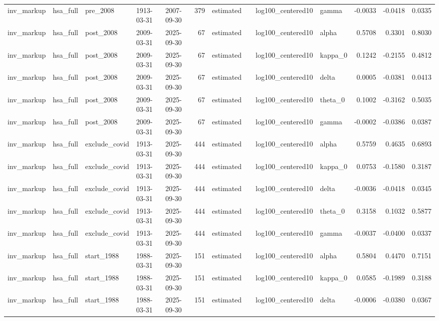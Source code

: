 \begin{tabular}{lllllrllllrrr}
inv\_markup & hsa\_full & pre\_2008 & 1913-03-31 & 2007-09-30 & 379 & estimated &  & log100\_centered10 & gamma & -0.0033 & -0.0418 & 0.0335 \\
inv\_markup & hsa\_full & post\_2008 & 2009-03-31 & 2025-09-30 & 67 & estimated &  & log100\_centered10 & alpha & 0.5708 & 0.3301 & 0.8030 \\
inv\_markup & hsa\_full & post\_2008 & 2009-03-31 & 2025-09-30 & 67 & estimated &  & log100\_centered10 & kappa\_0 & 0.1242 & -0.2155 & 0.4812 \\
inv\_markup & hsa\_full & post\_2008 & 2009-03-31 & 2025-09-30 & 67 & estimated &  & log100\_centered10 & delta & 0.0005 & -0.0381 & 0.0413 \\
inv\_markup & hsa\_full & post\_2008 & 2009-03-31 & 2025-09-30 & 67 & estimated &  & log100\_centered10 & theta\_0 & 0.1002 & -0.3162 & 0.5035 \\
inv\_markup & hsa\_full & post\_2008 & 2009-03-31 & 2025-09-30 & 67 & estimated &  & log100\_centered10 & gamma & -0.0002 & -0.0386 & 0.0387 \\
inv\_markup & hsa\_full & exclude\_covid & 1913-03-31 & 2025-09-30 & 444 & estimated &  & log100\_centered10 & alpha & 0.5759 & 0.4635 & 0.6893 \\
inv\_markup & hsa\_full & exclude\_covid & 1913-03-31 & 2025-09-30 & 444 & estimated &  & log100\_centered10 & kappa\_0 & 0.0753 & -0.1580 & 0.3187 \\
inv\_markup & hsa\_full & exclude\_covid & 1913-03-31 & 2025-09-30 & 444 & estimated &  & log100\_centered10 & delta & -0.0036 & -0.0418 & 0.0345 \\
inv\_markup & hsa\_full & exclude\_covid & 1913-03-31 & 2025-09-30 & 444 & estimated &  & log100\_centered10 & theta\_0 & 0.3158 & 0.1032 & 0.5877 \\
inv\_markup & hsa\_full & exclude\_covid & 1913-03-31 & 2025-09-30 & 444 & estimated &  & log100\_centered10 & gamma & -0.0037 & -0.0400 & 0.0337 \\
inv\_markup & hsa\_full & start\_1988 & 1988-03-31 & 2025-09-30 & 151 & estimated &  & log100\_centered10 & alpha & 0.5804 & 0.4470 & 0.7151 \\
inv\_markup & hsa\_full & start\_1988 & 1988-03-31 & 2025-09-30 & 151 & estimated &  & log100\_centered10 & kappa\_0 & 0.0585 & -0.1989 & 0.3188 \\
inv\_markup & hsa\_full & start\_1988 & 1988-03-31 & 2025-09-30 & 151 & estimated &  & log100\_centered10 & delta & -0.0006 & -0.0380 & 0.0367 \\

\end{tabular}
